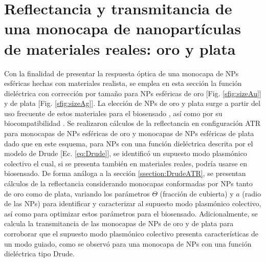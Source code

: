 
\section{Reflectancia y transmitancia de una monocapa de nanopartículas de materiales reales: oro y plata}
\label{section:AuAg}

Con la finalidad de presentar la respuesta óptica de una monocapa de NPs esféricas hechas con materiales realista, se emplea en esta sección la función dieléctrica con corrección por tamaño para NPs esféricas de oro [Fig. \ref{sfig:sizeAu}] y de plata [Fig. \ref{sfig:sizeAg}]. La elección de NPs de oro y plata surge a partir del uso frecuente de estos materiales para el biosensado \cite{jain2008noble,estevez2014trends}, así como por su biocompatibilidad \cite{fan2009bio,bosetti2002silver}. Se realizaron cálculos de la reflectancia en configuración ATR para monocapas de NPs esféricas de oro y monocapas de NPs esféricas de plata dado que en este esquema, para NPs con una función dieléctrica descrita por el modelo de Drude [Ec. \eqref{eq:Drude}], se identificó un supuesto modo plasmónico colectivo el cual, si se presenta también en materiales reales, podría usarse en biosensado. De forma análoga a la sección \ref{ssection:DrudeATR}, se presentan cálculos de la reflectancia  considerando monocapas conformadas por NPs tanto de oro como de plata, variando los parámetros $\Theta$ (fracción de cubierta) y  $a$ (radio de las NPs) para identificar y caracterizar al supuesto modo plasmónico colectivo, así como para optimizar estos parámetros para el biosensado. Adicionalmente, se calcula la transmitancia de las monocapas de NPs de oro y de plata para corroborar que el supuesto modo plasmónico colectivo presenta características de un modo guiado, como se observó para una monocapa de NPs con una función dieléctrica tipo Drude.

